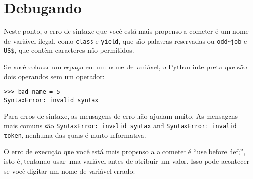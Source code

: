 {{{{{{{{{{{{{{{{{%
\section{Debugando}


Neste ponto, o erro de sintaxe que você está mais propenso a cometer é 
um nome de variável ilegal, como {\tt class} e {\tt yield}, que 
são palavras reservadas ou \verb"odd~job" e \verb"US$", que contêm 
caracteres não permitidos. 
 

Se você colocar um espaço em um nome de variável, o Python interpreta que são dois 
operandos sem um operador: 

\beforeverb
\begin{verbatim}
>>> bad name = 5
SyntaxError: invalid syntax
\end{verbatim}
\afterverb
%

Para erros de sintaxe, as mensagens de erro não ajudam muito. 
As mensagens mais comuns são {\tt SyntaxError: invalid syntax} and
{\tt SyntaxError: invalid token}, nenhuma das quais é muito informativa.


O erro de execução que você está mais propenso a a cometer é ``use 
before def;'', isto é, tentando usar uma variável antes de atribuir 
um valor. Isso pode acontecer se você digitar um nome de variável errado:

}}}}}}}}}}}}}}}}}
